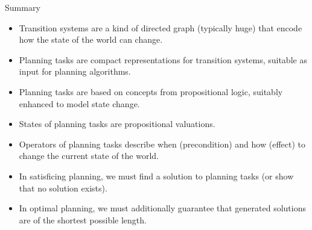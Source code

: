 \documentclass{gkibeamer}
\begin{document}
\begin{frame}{Summary}
  \begin{itemize}
  \item \alert{Transition systems} are a kind of directed graph
    (typically huge) that encode how the state of the world can
    change.
  \item \alert{Planning tasks} are compact representations for
    transition systems, suitable as input for planning algorithms.
  \item Planning tasks are based on concepts from \alert{propositional
    logic}, suitably enhanced to model state change.
  \item \alert{States} of planning tasks are propositional valuations.
  \item \alert{Operators} of planning tasks describe \alert{when}
    (precondition) and \alert{how} (effect) to change the current
    state of the world.
  \item In \alert{satisficing planning}, we must find a solution to
    planning tasks (or show that no solution exists).
  \item In \alert{optimal planning}, we must additionally guarantee
    that generated solutions are of the shortest possible length.
  \end{itemize}
\end{frame}
\end{document}
